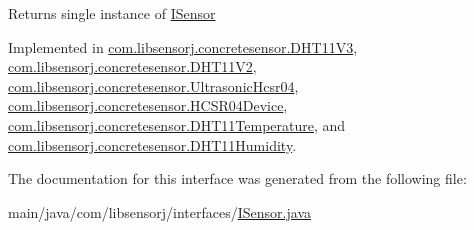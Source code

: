\begin{DoxyReturn}{Returns}
single instance of \hyperlink{interfacecom_1_1libsensorj_1_1interfaces_1_1ISensor}{I\+Sensor} 
\end{DoxyReturn}


Implemented in \hyperlink{classcom_1_1libsensorj_1_1concretesensor_1_1DHT11V3_a94e402a3ea89ad3ee46725fdd64b4c82}{com.\+libsensorj.\+concretesensor.\+D\+H\+T11\+V3}, \hyperlink{classcom_1_1libsensorj_1_1concretesensor_1_1DHT11V2_afff27f29285f26230faa8ecda6b6b102}{com.\+libsensorj.\+concretesensor.\+D\+H\+T11\+V2}, \hyperlink{classcom_1_1libsensorj_1_1concretesensor_1_1UltrasonicHcsr04_a170167614b330d79518647a9a9722b62}{com.\+libsensorj.\+concretesensor.\+Ultrasonic\+Hcsr04}, \hyperlink{classcom_1_1libsensorj_1_1concretesensor_1_1HCSR04Device_a3395de7d81b875516fb5c539accb27d1}{com.\+libsensorj.\+concretesensor.\+H\+C\+S\+R04\+Device}, \hyperlink{classcom_1_1libsensorj_1_1concretesensor_1_1DHT11Temperature_a599358623598fb0076dc0a2e07978f0b}{com.\+libsensorj.\+concretesensor.\+D\+H\+T11\+Temperature}, and \hyperlink{classcom_1_1libsensorj_1_1concretesensor_1_1DHT11Humidity_a2355dc003abad8d519440e9f6871c422}{com.\+libsensorj.\+concretesensor.\+D\+H\+T11\+Humidity}.



The documentation for this interface was generated from the following file\+:\begin{DoxyCompactItemize}
\item 
main/java/com/libsensorj/interfaces/\hyperlink{ISensor_8java}{I\+Sensor.\+java}\end{DoxyCompactItemize}
